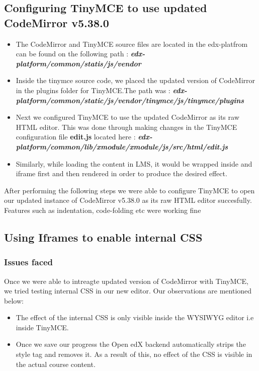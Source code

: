 \subsection{Configuring TinyMCE to use updated CodeMirror v5.38.0}
\begin{itemize}
\item The CodeMirror and TinyMCE source files are located in the edx-platfrom can be found on
the following path : \textit{\textbf{edx-platform/common/statis/js/vendor}}
\item Inside the tinymce source code, we placed the updated version of CodeMirror in the plugins
folder for TinyMCE.\newline The path was :
\textit{\textbf{edx-platform/common/static/js/vendor/tinymce/js/tinymce/plugins}}
\item Next we configured TinyMCE to use the updated CodeMirror as its raw HTML editor. This
was done through making changes in the TinyMCE configuration file \textbf{edit.js} located here :\newline
\textbf{\textit{edx-platform/common/lib/xmodule/xmodule/js/src/html/edit.js}}
\item Similarly, while loading the content in LMS, it would be wrapped inside and iframe
first and then rendered in order to produce the desired effect.
\end{itemize}
After performing the following steps we were able to configure TinyMCE to open our updated
instance of CodeMirror v5.38.0 as its raw HTML editor succesfully. Features such as indentation,
code-folding etc were working fine

\subsection{Using Iframes to enable internal CSS}
\subsubsection{Issues faced}
Once we were able to intreagte updated version of CodeMirror with TinyMCE, we tried testing
internal CSS in our new editor. Our observations are mentioned below:
\begin{itemize}
\item  The effect of the internal CSS is only visible inside the WYSIWYG editor i.e inside
TinyMCE.
\item  Once we save our progress the Open edX backend automatically strips the style tag and
removes it. As a result of this, no effect of the CSS is visible in the actual course content.
\end{itemize}

